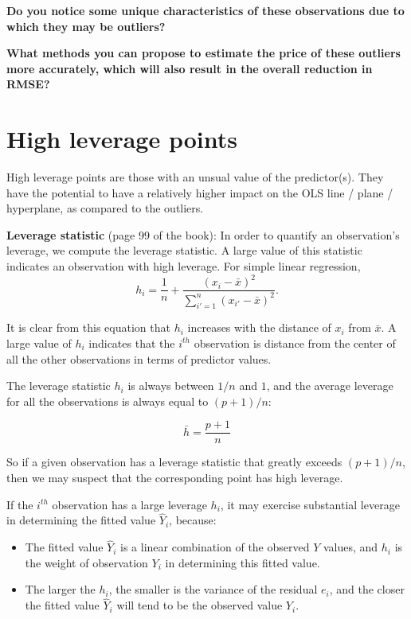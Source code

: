 \documentclass[
  letterpaper,
  DIV=11,
  numbers=noendperiod]{scrreprt}
\begin{document}
\textbf{Do you notice some unique characteristics of these observations
due to which they may be outliers?}

\textbf{What methods you can propose to estimate the price of these
outliers more accurately, which will also result in the overall
reduction in RMSE?}

\section{High leverage points}\label{high-leverage-points}

High leverage points are those with an unsual value of the predictor(s).
They have the potential to have a relatively higher impact on the OLS
line / plane / hyperplane, as compared to the outliers.

\textbf{Leverage statistic} (page 99 of the book): In order to quantify
an observation's leverage, we compute the leverage statistic. A large
value of this statistic indicates an observation with high leverage. For
simple linear regression, \begin{equation}
h_i = \frac{1}{n} + \frac{(x_i - \bar x)^2}{\sum_{i'=1}^{n}(x_{i'} - \bar x)^2}.
\end{equation}

It is clear from this equation that \(h_i\) increases with the distance
of \(x_i\) from \(\bar x\). A large value of \(h_i\) indicates that the
\(i^{th}\) observation is distance from the center of all the other
observations in terms of predictor values.

The leverage statistic \(h_i\) is always between \(1/n\) and \(1\), and
the average leverage for all the observations is always equal to
\((p+1)/n\):

\begin{equation}
\bar{h} = \frac{p+1}{n}
\end{equation}

So if a given observation has a leverage statistic that greatly exceeds
\((p+1)/n\), then we may suspect that the corresponding point has high
leverage.

If the \(i^{th}\) observation has a large leverage \(h_i\), it may
exercise substantial leverage in determining the fitted value
\(\hat{Y}_i\), because:

\begin{itemize}
\item
  The fitted value \(\hat{Y}_i\) is a linear combination of the observed
  \(Y\) values, and \(h_i\) is the weight of observation \(Y_i\) in
  determining this fitted value.
\item
  The larger the \(h_i\), the smaller is the variance of the residual
  \(e_i\), and the closer the fitted value \(\hat{Y}_i\) will tend to be
  the observed value \(Y_i\).
\end{itemize}
\end{document}
